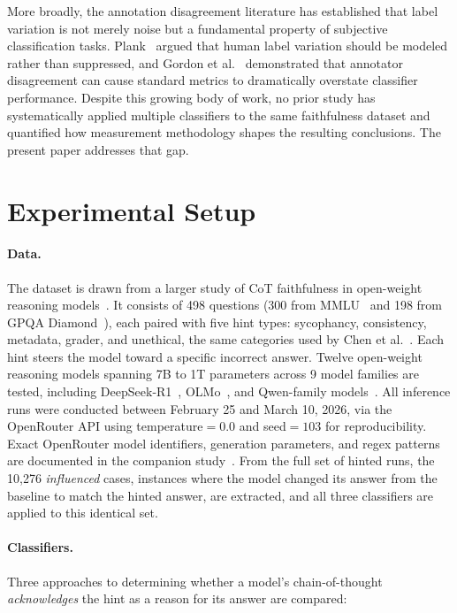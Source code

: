 More broadly, the annotation disagreement literature has established that label variation is not merely noise but a fundamental property of subjective classification tasks. Plank~\cite{plank2022problem} argued that human label variation should be modeled rather than suppressed, and Gordon et al.~\cite{gordon2021disagreement} demonstrated that annotator disagreement can cause standard metrics to dramatically overstate classifier performance. Despite this growing body of work, no prior study has systematically applied multiple classifiers to the same faithfulness dataset and quantified how measurement methodology shapes the resulting conclusions. The present paper addresses that gap.

\section{Experimental Setup}

\paragraph{Data.} The dataset is drawn from a larger study of CoT faithfulness in open-weight reasoning models~\cite{young2026lietome}. It consists of 498 questions (300 from MMLU~\cite{hendrycks2021mmlu} and 198 from GPQA Diamond~\cite{rein2024gpqa}), each paired with five hint types: sycophancy, consistency, metadata, grader, and unethical, the same categories used by Chen et al.~\cite{chen2025reasoning}. Each hint steers the model toward a specific incorrect answer. Twelve open-weight reasoning models spanning 7B to 1T parameters across 9 model families are tested, including DeepSeek-R1~\cite{deepseek2025r1}, OLMo~\cite{groeneveld2024olmo}, and Qwen-family models~\cite{qwen2024technical}. All inference runs were conducted between February 25 and March 10, 2026, via the OpenRouter API using temperature$=0.0$ and seed$=103$ for reproducibility. Exact OpenRouter model identifiers, generation parameters, and regex patterns are documented in the companion study~\cite{young2026lietome}. From the full set of hinted runs, the 10,276 \emph{influenced} cases, instances where the model changed its answer from the baseline to match the hinted answer, are extracted, and all three classifiers are applied to this identical set.

\paragraph{Classifiers.} Three approaches to determining whether a model's chain-of-thought \emph{acknowledges} the hint as a reason for its answer are compared:

